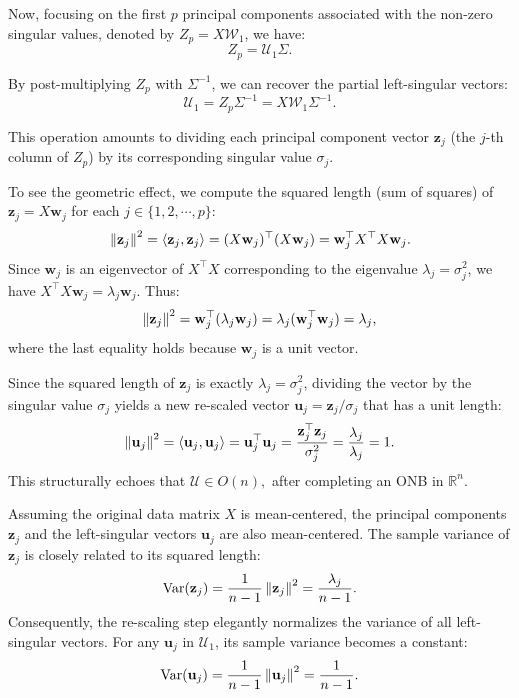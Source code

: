 \documentclass[12pt]{article}
\begin{document}
Now, focusing on the first $p$ principal components associated with the non-zero singular values, denoted by $Z_p = X\mathcal{W}_1$, we have:
\[
Z_p = \mathcal{U}_1\Sigma.
\]

By post-multiplying $Z_p$ with $\Sigma^{-1}$, we can recover the partial left-singular vectors:
\[
\mathcal{U}_1 = Z_p\Sigma^{-1} = X\mathcal{W}_1\Sigma^{-1}.
\]

This operation amounts to dividing each principal component vector $\mathbf{z}_j$ (the $j$-th column of $Z_p$) by its corresponding singular value $\sigma_j$. 

To see the geometric effect, we compute the squared length (sum of squares) of $\mathbf{z}_j = X \mathbf{w}_j$ for each $j \in \{1,2,\cdots,p\}$:
\[
\left\lVert \mathbf{z}_j \right\rVert^2 = \langle\mathbf{z}_j, \mathbf{z}_j\rangle =  (X \mathbf{w}_j)^\top (X \mathbf{w}_j) = \mathbf{w}_j^\top X^\top X \mathbf{w}_j.
\]
Since $\mathbf{w}_j$ is an eigenvector of $X^\top X$ corresponding to the eigenvalue $\lambda_j = \sigma_j^2$, we have $X^\top X \mathbf{w}_j = \lambda_j \mathbf{w}_j$. Thus:
\[
\left\lVert \mathbf{z}_j \right\rVert^2 = \mathbf{w}_j^\top (\lambda_j \mathbf{w}_j) = \lambda_j (\mathbf{w}_j^\top \mathbf{w}_j) = \lambda_j,
\]
where the last equality holds because $\mathbf{w}_j$ is a unit vector.

Since the squared length of $\mathbf{z}_j$ is exactly $\lambda_j = \sigma_j^2$, dividing the vector by the singular value $\sigma_j$ yields a new re-scaled vector $\mathbf{u}_j = \mathbf{z}_j / \sigma_j$ that has a unit length:
\[
\left\lVert \mathbf{u}_j \right\rVert^2 = \langle\mathbf{u}_j, \mathbf{u}_j\rangle =  \mathbf{u}_j^\top \mathbf{u}_j = \frac{\mathbf{z}_j^\top \mathbf{z}_j}{\sigma_j^2} = \frac{\lambda_j}{\lambda_j} = 1.
\]
This structurally echoes that $\mathcal{U}\in O(n),$ after completing an ONB in $\mathbb{R}^n.$

\begin{remark}
Assuming the original data matrix $X$ is mean-centered, the principal components $\mathbf{z}_j$ and the left-singular vectors $\mathbf{u}_j$ are also mean-centered. The sample variance of $\mathbf{z}_j$ is closely related to its squared length:
\[
\operatorname{Var}(\mathbf{z}_j) = \frac{1}{n-1} \left\lVert \mathbf{z}_j \right\rVert^2 = \frac{\lambda_j}{n-1}.
\]
Consequently, the re-scaling step elegantly normalizes the variance of all left-singular vectors. For any $\mathbf{u}_j$ in $\mathcal{U}_1$, its sample variance becomes a constant:
\[
\operatorname{Var}(\mathbf{u}_j) = \frac{1}{n-1} \left\lVert \mathbf{u}_j \right\rVert^2 = \frac{1}{n-1}.
\]
\end{remark}
\end{document}
